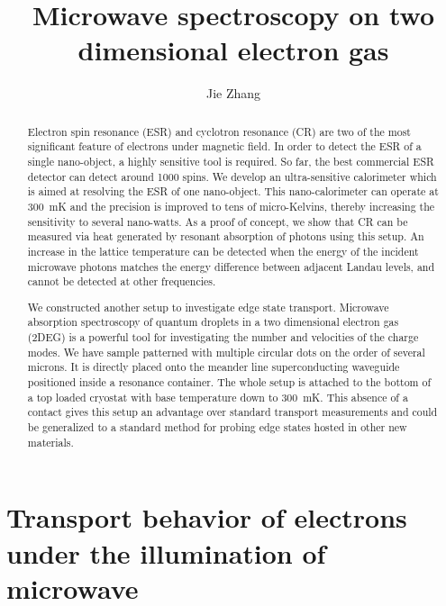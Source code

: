 \documentclass[12pt]{ruthesis}
\title{Microwave spectroscopy on two dimensional electron gas}
\author{Jie Zhang}
\begin{document}
  \begin{frontmatter}
   \maketitle

\begin{abstract}

Electron spin resonance (ESR) and cyclotron resonance (CR) are two of the most significant feature of electrons under magnetic field.
In order to detect the ESR of a single nano-object, a highly sensitive tool is required.
So far, the best commercial ESR detector can detect around 1000 spins.
We develop an ultra-sensitive calorimeter which is aimed at resolving the ESR of one nano-object.
This nano-calorimeter can operate at \SI{300}{\milli\kelvin} and the precision is improved to tens of micro-Kelvins, thereby increasing the sensitivity to several nano-watts.
As a proof of concept, we show that CR can be measured via heat generated by resonant absorption of photons using this setup.
An increase in the lattice temperature can be detected when the energy of the incident microwave photons matches the energy difference between adjacent Landau levels, and cannot be detected at other frequencies.

We constructed another setup to investigate edge state transport.
Microwave absorption spectroscopy of quantum droplets in a two dimensional electron gas (2DEG) is a powerful tool for investigating the number and velocities of the charge modes.
We have sample patterned with multiple circular dots on the order of several microns.
It is directly placed onto the meander line superconducting waveguide positioned inside a resonance container.
The whole setup is attached to the bottom of a top loaded  cryostat with base temperature down to \SI{300}{\milli\kelvin}.
This absence of a contact gives this setup an advantage over standard transport measurements and could be generalized to a standard method for probing edge states hosted in other new materials.


\end{abstract}

%
\tableofcontents
\listoffigures
%   
\end{frontmatter}



\chapter{Transport behavior of electrons under the illumination of microwave}\label{Transport}
\end{document}
